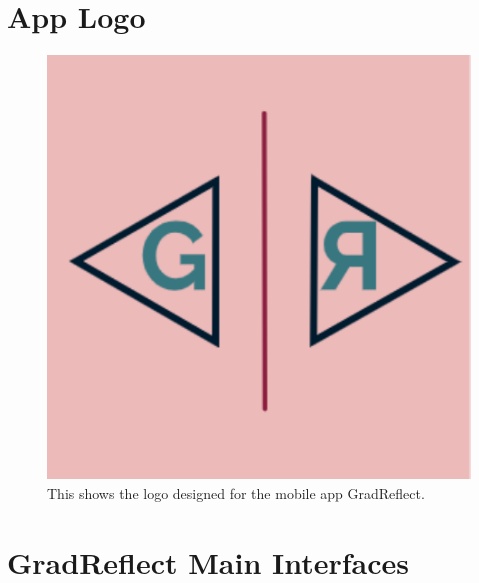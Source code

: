 \documentclass{l4proj}
\begin{document}
\begin{appendices}
%

\section{App Logo} \label{Appendix-AppLogo}

\begin{figure}[H]
    \centering
    \includegraphics[scale=1]{images/AppLogo.pdf}    
    \caption{This shows the logo designed for the mobile app GradReflect.}
    \label{fig:AppLogo} 
\end{figure}

%

\section{GradReflect Main Interfaces} \label{Appendix-AppInterfaces}


\end{appendices}
\end{document}
